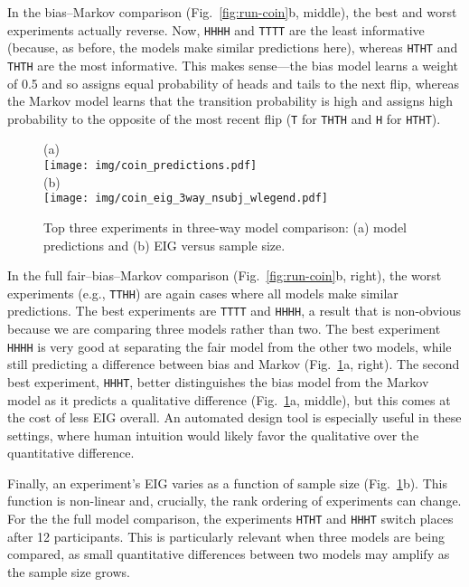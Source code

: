 \documentclass[10pt,letterpaper]{article}
\begin{document}
In the bias--Markov comparison (Fig.~\ref{fig:run-coin}b, middle), the best and worst experiments actually reverse.
Now, \lstinline{HHHH} and \lstinline{TTTT} are the least informative (because, as before, the models make similar predictions here), whereas \lstinline{HTHT} and \lstinline{THTH} are the most informative.
This makes sense---the bias model learns a weight of 0.5 and so assigns equal probability of heads and tails to the next flip, whereas the Markov model learns that the transition probability is high and assigns high probability to the opposite of the most recent flip (\lstinline{T} for \lstinline{THTH} and \lstinline{H} for \lstinline{HTHT}).

\begin{figure}[t]
            (a) \\ \texttt{[image: img/coin\_predictions.pdf]}\\ (b) \\ \texttt{[image: img/coin\_eig\_3way\_nsubj\_wlegend.pdf]}
  \caption{Top three experiments in three-way model comparison: (a) model predictions and (b) EIG versus sample size.}
  \label{fig:coin_preds}
\end{figure}

In the full fair--bias--Markov comparison (Fig.~\ref{fig:run-coin}b, right), the worst experiments (e.g., \lstinline{TTHH}) are again cases where all models make similar predictions.
The best experiments are \lstinline{TTTT} and \lstinline{HHHH}, a result that is non-obvious because we are comparing three models rather than two.
The best experiment \lstinline{HHHH} is very good at separating the fair model from the other two models, while still predicting a difference between bias and Markov (Fig.~\ref{fig:coin_preds}a, right).
The second best experiment, \lstinline{HHHT}, better distinguishes the bias model from the Markov model as it predicts a qualitative difference (Fig.~\ref{fig:coin_preds}a, middle), but this comes at the cost of less EIG overall.
An automated design tool is especially useful in these settings, where human intuition would likely favor the qualitative over the quantitative difference.

Finally, an experiment's EIG varies as a function of sample size (Fig.~\ref{fig:coin_preds}b).
This function is non-linear and, crucially, the rank ordering of experiments can change.
For the the full model comparison, the experiments \lstinline{HTHT} and \lstinline{HHHT} switch places after 12 participants.
This is particularly relevant when three models are being compared, as small quantitative differences between two models may amplify as the sample size grows.
\end{document}
